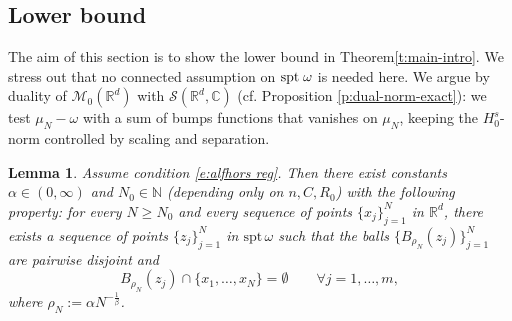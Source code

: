 \documentclass[12pt,a4paper,oneside]{amsart}
\theoremstyle{plain}
\newtheorem{lemma}[theorem]{Lemma}
\theoremstyle{definition}
\numberwithin{equation}{section}
\numberwithin{figure}{section}
\numberwithin{table}{section}
\theoremstyle{remark}
\newcommand{\R}{\mathbb{R}}
\newcommand{\N}{\mathbb{N}}
\newcommand{\expAhlfors}{\beta}
\begin{document}
\subsection{Lower bound}\label{sec:lower bound}
The aim of this section is to show the lower bound in Theorem\ref{t:main-intro}. We stress out that no connected assumption on $\textup{spt} \; \omega$ is needed here. We argue by duality of $\mathcal{M}_0(\mathbb{R}^d)$ with $\mathcal{S}(\R^d,\mathbb{C})$ (cf. Proposition \ref{p:dual-norm-exact}): we test $\mu_N-\omega$ with a sum of bumps functions that vanishes on $\mu_N$, keeping the $H^s_0$-norm controlled by scaling and separation.

\begin{lemma}\label{l:palle vuote}
Assume condition \eqref{e:alfhors reg}. Then there exist constants $\alpha\in(0,\infty)$ and $N_0\in\N$
(depending only on $n,C,R_0$) with the following property: for every $N\ge N_0$ and every sequence of points $\{x_j\}_{j=1}^N$ in $\R^d$, there exists a sequence of points $\{z_j\}_{j=1}^N$ in  
$\mathrm{spt}\,\omega$ 
such that the balls $\{B_{\rho_N}(z_j)\}_{j=1}^N$ are pairwise disjoint and 
\begin{equation}\label{e:palle vuote}
B_{\rho_N}(z_j)\cap\{x_1,\dots,x_N\}=\emptyset \qquad\forall j=1,\dots,m,
\end{equation}
where $\rho_N:=\alpha N^{-\frac1\expAhlfors}$.
\end{lemma}
\end{document}
